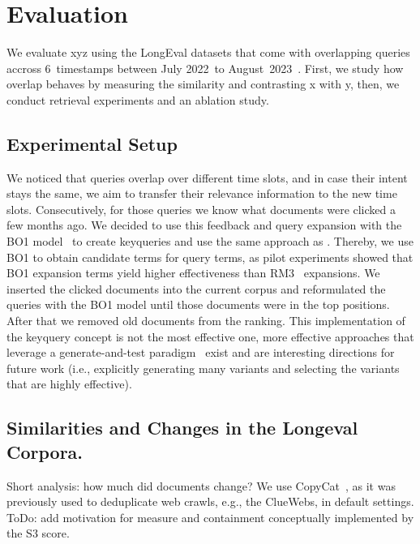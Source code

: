 \section{Evaluation}

We evaluate xyz using the LongEval datasets that come with overlapping queries accross 6~timestamps between July 2022~to August~2023~\cite{alkhalifa:2023,alkhalifa:2024,galuscakova:2023}. First, we study how overlap behaves by measuring the similarity and contrasting x with y, then, we conduct retrieval experiments and an ablation study.

\subsection{Experimental Setup}


We noticed that queries overlap over different time slots, and in case their intent stays the same, we aim to transfer their relevance information to the new time slots. Consecutively, for those queries we know what documents were clicked a few months ago. We decided to use this feedback and query expansion with the BO1 model~\cite{amati:2003} to create keyqueries and use the same approach as \cite{froebe-mis:2022}. Thereby, we use BO1 to obtain candidate terms for query terms, as pilot experiments showed that BO1 expansion terms yield higher effectiveness than RM3~\cite{jaleel:2004} expansions. We inserted the clicked documents into the current corpus and reformulated the queries with the BO1 model until those documents were in the top positions. After that we removed old documents from the ranking. This implementation of the keyquery concept is not the most effective one, more effective approaches that leverage a generate-and-test paradigm~\cite{froebe:2021c} exist and are interesting directions for future work (i.e., explicitly generating many variants and selecting the variants that are highly effective).


\subsection{Similarities and Changes in the Longeval Corpora.}

Short analysis: how much did documents change? We use CopyCat~\cite{froebe:2021a}, as it was previously used to deduplicate web crawls, e.g., the ClueWebs, in default settings. ToDo: add motivation for measure and containment conceptually implemented by the S3 score.

